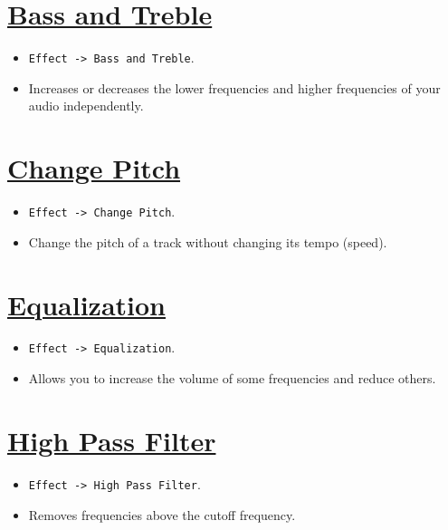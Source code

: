 
\section{\href{http://manual.audacityteam.org/o/man/bass_and_treble.html}{Bass and Treble}}
\begin{itemize}
\item \verb|Effect -> Bass and Treble|.
\item Increases or decreases the lower frequencies and higher
  frequencies of your audio independently.
\end{itemize}

\section{\href{http://manual.audacityteam.org/o/man/change_pitch.html}{Change Pitch}}
\begin{itemize}
\item \verb|Effect -> Change Pitch|.
\item Change the pitch of a track without changing its tempo (speed).
\end{itemize}

\section{\href{http://manual.audacityteam.org/o/man/equalization.html}{Equalization}}
\begin{itemize}
\item \verb|Effect -> Equalization|.
\item Allows you to increase the volume of some frequencies and reduce others.
\end{itemize}

\section{\href{http://manual.audacityteam.org/o/man/high_pass_filter.html}{High Pass Filter}}
\begin{itemize}
\item \verb|Effect -> High Pass Filter|.
\item Removes frequencies above the cutoff frequency.
\end{itemize}

